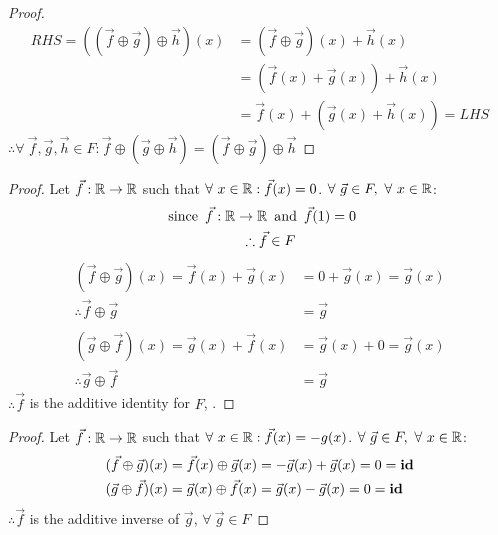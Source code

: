 \begin{enumerate}
\begin{proof}
\begin{align*}
      RHS = ((\vec{f} \oplus \vec{g}) \oplus \vec{h})(x) & = (\vec{f} \oplus \vec{g})(x) + \vec{h}(x)     \\
                                                         & = (\vec{f}(x) + \vec{g}(x)) + \vec{h}(x)       \\
                                                         & = \vec{f}(x) + (\vec{g}(x) + \vec{h}(x)) = LHS
    \end{align*}
    $\therefore \forall~\vec{f},\vec{g},\vec{h} \in F: \vec{f} \oplus (\vec{g} \oplus \vec{h}) = (\vec{f} \oplus \vec{g}) \oplus \vec{h}$
  \end{proof}
  \begin{proof}
    Let $\vec{f}: \mathbb{R} \rightarrow \mathbb{R}$ such that $\forall~x \in \mathbb{R}: \vec{f}(x) = 0$. $\forall~\vec{g} \in F,~\forall~x \in \mathbb{R}$:
    \begin{align*}
      \operatorname{~\text{since}~} \vec{f}: \mathbb{R} \rightarrow \mathbb{R} & \operatorname{~\text{and}~} \vec{f}(1) = 0 \\
      \therefore \vec{f}                         & \in F
    \end{align*}
    \begin{align*}
      (\vec{f} \oplus \vec{g})(x) = \vec{f}(x) + \vec{g}(x) & = 0 + \vec{g}(x)= \vec{g}(x) \\
      \therefore \vec{f} \oplus \vec{g}                     & = \vec{g}                    \\ \\
      (\vec{g} \oplus \vec{f})(x) = \vec{g}(x) + \vec{f}(x) & = \vec{g}(x) + 0= \vec{g}(x) \\
      \therefore \vec{g} \oplus \vec{f}                     & = \vec{g}
    \end{align*}
    $\therefore \vec{f}$ is the additive identity for $F$, .
  \end{proof}
  \begin{proof}
    Let $\vec{f}: \mathbb{R} \rightarrow \mathbb{R}$ such that $\forall~x \in \mathbb{R}: \vec{f}(x) = -g(x)$. $\forall~\vec{g} \in F,~\forall~x \in \mathbb{R}$:
    \begin{align*}
      (\vec{f} \oplus \vec{g})(x) = \vec{f}(x) \oplus \vec{g}(x) & = -\vec{g}(x) + \vec{g}(x)= 0 = \textbf{id} \\
      (\vec{g} \oplus \vec{f})(x) = \vec{g}(x) \oplus \vec{f}(x) & = \vec{g}(x) - \vec{g}(x)= 0 = \textbf{id}
    \end{align*}
    $\therefore \vec{f}$ is the additive inverse of $\vec{g}$, $\forall~\vec{g} \in F$
  \end{proof}

\end{enumerate}
